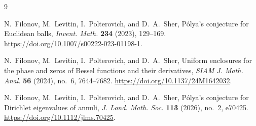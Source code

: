 \documentclass[11pt]{article}
\theoremstyle{remark}
\begin{document}
\begin{thebibliography}{9}

N.~Filonov, M.~Levitin, I.~Polterovich, and D.~A.~Sher,
\newblock P\'olya's conjecture for Euclidean balls,
\newblock \emph{Invent. Math.} \textbf{234} (2023), 129--169.
\newblock \url{https://doi.org/10.1007/s00222-023-01198-1}.

N.~Filonov, M.~Levitin, I.~Polterovich, and D.~A.~Sher,
\newblock Uniform enclosures for the phase and zeros of Bessel functions
and their derivatives,
\newblock \emph{SIAM J. Math. Anal.} \textbf{56} (2024), no.~6,
7644--7682.
\newblock \url{https://doi.org/10.1137/24M1642032}.

N.~Filonov, M.~Levitin, I.~Polterovich, and D.~A.~Sher,
\newblock P\'olya's conjecture for Dirichlet eigenvalues of annuli,
\newblock \emph{J. Lond. Math. Soc.} \textbf{113} (2026), no.~2, e70425.
\newblock \url{https://doi.org/10.1112/jlms.70425}.

\end{thebibliography}
\end{document}
